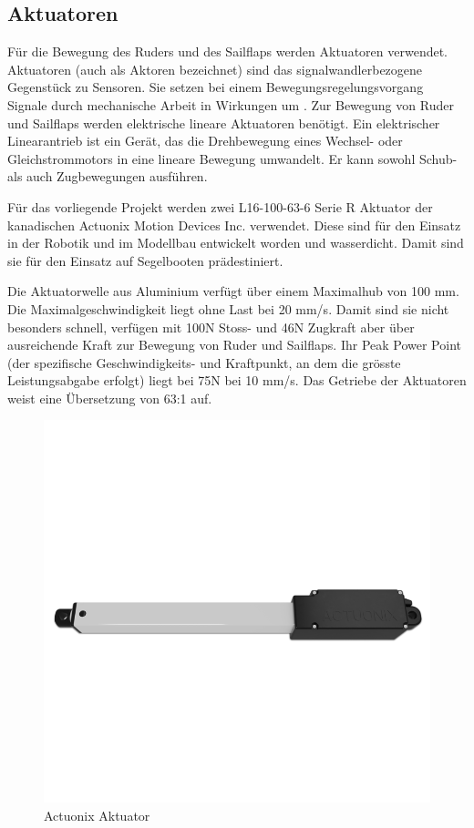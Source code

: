 \subsection{Aktuatoren}
Für die Bewegung des Ruders und des Sailflaps werden Aktuatoren verwendet. Aktuatoren (auch als Aktoren bezeichnet) sind das signalwandlerbezogene Gegenstück zu Sensoren. Sie setzen bei einem Bewegungsregelungsvorgang Signale durch mechanische Arbeit in Wirkungen um \cite{noauthor_aktor_2023}. Zur Bewegung von Ruder und Sailflaps werden elektrische lineare Aktuatoren benötigt. Ein elektrischer Linearantrieb ist ein Gerät, das die Drehbewegung eines Wechsel- oder Gleichstrommotors in eine lineare Bewegung umwandelt. Er kann sowohl Schub- als auch Zugbewegungen ausführen.

Für das vorliegende Projekt werden zwei L16-100-63-6 Serie R Aktuator der kanadischen Actuonix Motion Devices Inc. verwendet. Diese sind für den Einsatz in der Robotik und im Modellbau entwickelt worden und wasserdicht. Damit sind sie für den Einsatz auf Segelbooten prädestiniert.

Die Aktuatorwelle aus Aluminium verfügt über einem Maximalhub von 100 mm. Die Maximalgeschwindigkeit liegt ohne Last bei 20 mm/s. Damit sind sie nicht besonders schnell, verfügen mit 100N Stoss- und 46N Zugkraft aber über ausreichende Kraft zur Bewegung von Ruder und Sailflaps. Ihr Peak Power Point (der spezifische Geschwindigkeits- und Kraftpunkt, an dem die grösste Leistungsabgabe erfolgt) liegt bei 75N bei 10 mm/s. Das Getriebe der Aktuatoren weist eine Übersetzung von 63:1 auf.

\begin{figure}
    \centering
    \includegraphics[width=0.75\linewidth]{actuonix.png}
    \caption{Actuonix Aktuator}
    \label{fig:actuator}
\end{figure}

